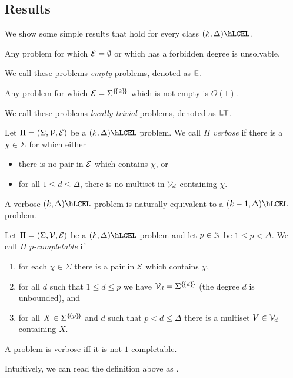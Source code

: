 \documentclass[12pt,a4paper]{article}
\begin{document}
\subsection{Results}
We show some simple results that hold for every class $(k,\Delta)\hLCEL$.
\begin{lem}
    Any problem for which $\mathcal{E}=\emptyset$ or which has a forbidden degree is unsolvable.
\end{lem}
We call these problems \emph{empty} problems, denoted as $\emp$.
\begin{lem}
    Any problem for which $\mathcal{E}=\Sigma^{\left\lbrace \! \left\lbrace2\right\rbrace \! \right\rbrace}$ which is not empty is $O(1)$.
\end{lem} %
We call these problems \emph{locally trivial} problems, denoted as $\Tloc$.
\begin{defn}
    Let $\Pi=(\Sigma,\mathcal{V},\mathcal{E})$ be a $(k,\Delta)\hLCEL$ problem. We call $\Pi$ \emph{verbose} if there is a $\chi\in\Sigma$ for which either
    \begin{itemize}
        \item there is no pair in $\mathcal{E}$ which contains $\chi$, or
        \item for all $1\leq d\leq \Delta$, there is no multiset in $\mathcal{V}_d$ containing $\chi$.
    \end{itemize}
\end{defn}
\begin{obs}
    A verbose $(k,\Delta)\hLCEL$ problem is naturally equivalent to a $(k-1,\Delta)\hLCEL$ problem.
\end{obs}
\begin{defn}
    Let $\Pi=(\Sigma,\mathcal{V},\mathcal{E})$ be a $(k,\Delta)\hLCEL$ problem and let $p\in\mathbb{N}$ be $1\leq p<\Delta$. We call $\Pi$ \emph{$p$-completable} if
    \begin{enumerate}
        \item for each $\chi\in\Sigma$ there is a pair in $\mathcal{E}$ which contains $\chi$,
        \item for all $d$ such that $1\leq d\leq p$ we have $\mathcal{V}_d=\Sigma^{\left\lbrace \! \left\lbrace d\right\rbrace \! \right\rbrace}$ (the degree $d$ is unbounded), and
        \item for all $X\in\Sigma^{\left\lbrace \! \left\lbrace p\right\rbrace \! \right\rbrace}$ and $d$ such that $p < d\leq \Delta$ there is a multiset $V\in\mathcal{V}_d$ containing $X$.
    \end{enumerate}
\end{defn}
\begin{lem}
    A problem is verbose iff it is not $1$-completable.
\end{lem}
Intuitively, we can read the definition above as .
\end{document}
